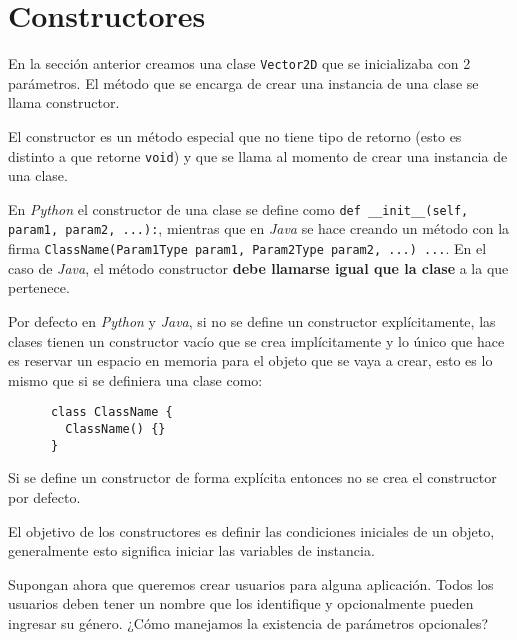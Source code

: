 \section{Constructores}
  
  En la sección anterior creamos una clase \texttt{Vector2D} que se inicializaba con 2
  parámetros.
  El método que se encarga de crear una instancia de una clase se llama constructor.

  El constructor es un método especial que no tiene tipo de retorno (esto es distinto a 
  que retorne \texttt{void}) y que se llama al momento de crear una instancia de
  una clase.

  En \textit{Python} el constructor de una clase se define como 
  \texttt{def __init__(self, param1, param2, ...):}, mientras que en 
  \textit{Java} se hace creando un método con la firma 
  \texttt{ClassName(Param1Type param1, Param2Type param2, ...) {...}}.
  En el caso de \textit{Java}, el método constructor \textbf{debe llamarse igual que la 
  clase} a la que pertenece.

  Por defecto en \textit{Python} y \textit{Java}, si no se define un constructor 
  explícitamente, las clases tienen un constructor vacío que se crea implícitamente y lo 
  único que hace es reservar un espacio en memoria para el objeto que se vaya a crear, 
  esto es lo mismo que si se definiera una clase como:

  \begin{listing}[ht!]
    \begin{verbatim}
      class ClassName {
        ClassName() {}
      }
    \end{verbatim}
  \end{listing}

  \begin{important}
    Si se define un constructor de forma explícita entonces no se crea el constructor por 
    defecto.
  \end{important}

  El objetivo de los constructores es definir las condiciones iniciales de un objeto, 
  generalmente esto significa iniciar las variables de instancia.

  Supongan ahora que queremos crear usuarios para alguna aplicación.
  Todos los usuarios deben tener un nombre que los identifique y opcionalmente pueden 
  ingresar su género.
  ¿Cómo manejamos la existencia de parámetros opcionales?

